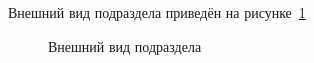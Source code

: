 	Внешний вид подраздела приведён на рисунке~\ref{university:detailview}
	
	\begin{figure}[H]
	\caption{Внешний вид подраздела }
	\label{university:detailview}
	\end{figure}
	
